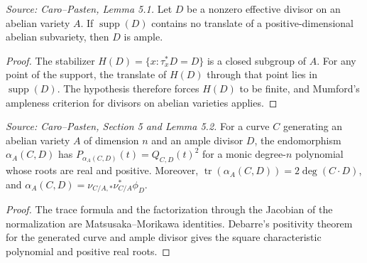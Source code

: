 \begin{lemma}
  \label{lem:cp_ample_abvar_divisor}
  \textit{Source: Caro--Pasten, Lemma 5.1.}
  Let \(D\) be a nonzero effective divisor on an abelian variety \(A\).  If
  \(\operatorname{supp}(D)\) contains no translate of a positive-dimensional
  abelian subvariety, then \(D\) is ample.
\end{lemma}
\begin{proof}
  The stabilizer \(H(D)=\{x:\tau_x^*D=D\}\) is a closed subgroup of \(A\).
  For any point of the support, the translate of \(H(D)\) through that point
  lies in \(\operatorname{supp}(D)\).  The hypothesis therefore forces
  \(H(D)\) to be finite, and Mumford's ampleness criterion for divisors on
  abelian varieties applies.
\end{proof}

\begin{lemma}
  \label{lem:cp_abvar_degree_trace_package}
  \textit{Source: Caro--Pasten, Section 5 and Lemma 5.2.}
  For a curve \(C\) generating an abelian variety \(A\) of dimension \(n\) and
  an ample divisor \(D\), the endomorphism \(\alpha_A(C,D)\) has
  \(P_{\alpha_A(C,D)}(t)=Q_{C,D}(t)^2\) for a monic degree-\(n\) polynomial
  whose roots are real and positive.  Moreover,
  \(\operatorname{tr}(\alpha_A(C,D))=2\deg(C\cdot D)\), and
  \(\alpha_A(C,D)=\nu_{C/A,*}\nu_{C/A}^*\phi_D\).
\end{lemma}
\begin{proof}
  The trace formula and the factorization through the Jacobian of the
  normalization are Matsusaka--Morikawa identities.  Debarre's positivity
  theorem for the generated curve and ample divisor gives the square
  characteristic polynomial and positive real roots.
\end{proof}


